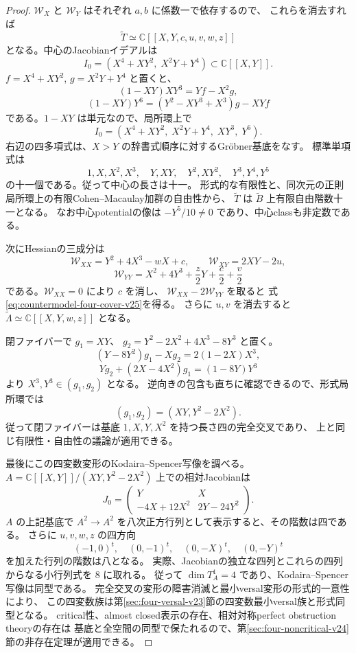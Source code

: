 \begin{proof}
$\mathcal W_X$ と $\mathcal W_Y$ はそれぞれ $a,b$ に係数一で依存するので、
これらを消去すれば
\[
 \widetilde T\simeq\mathbb C[[X,Y,c,u,v,w,z]]
\]
となる。中心のJacobianイデアルは
\[
 I_0=(X^4+XY^2,\;X^2Y+Y^4)\subset\mathbb C[[X,Y]].
\]
$f=X^4+XY^2$, $g=X^2Y+Y^4$ と置くと、
\[
 (1-XY)XY^3=Yf-X^2g,
\]
\[
 (1-XY)Y^6=(Y^2-XY^3+X^3)g-XYf
\]
である。$1-XY$ は単元なので、局所環上で
\[
 I_0=(X^4+XY^2,\;X^2Y+Y^4,\;XY^3,\;Y^6).
\]
右辺の四多項式は、$X>Y$ の辞書式順序に対するGr\"obner基底をなす。
標準単項式は
\[
 1,X,X^2,X^3,\quad Y,XY,\quad Y^2,XY^2,\quad Y^3,Y^4,Y^5
\]
の十一個である。従って中心の長さは十一。
形式的な有限性と、同次元の正則局所環上の有限Cohen--Macaulay加群の自由性から、
$\widetilde T$ は $\widetilde B$ 上有限自由階数十一となる。
なお中心potentialの像は $-Y^5/10\ne0$ であり、中心classも非定数である。

次にHessianの三成分は
\[
 \mathcal W_{XX}=Y^2+4X^3-wX+c,
 \qquad \mathcal W_{XY}=2XY-2u,
\]
\[
 \mathcal W_{YY}=X^2+4Y^3+\frac z2Y+\frac c2+\frac v2
\]
である。$\mathcal W_{XX}=0$ により $c$ を消し、
$\mathcal W_{XX}-2\mathcal W_{YY}$ を取ると
式\eqref{eq:countermodel-four-cover-v25}を得る。
さらに $u,v$ を消去すると
$\widetilde\Lambda\simeq\mathbb C[[X,Y,w,z]]$ となる。

閉ファイバーで $g_1=XY$、
$g_2=Y^2-2X^2+4X^3-8Y^3$ と置く。
\[
 (Y-8Y^2)g_1-Xg_2=2(1-2X)X^3,
\]
\[
 Yg_2+(2X-4X^2)g_1=(1-8Y)Y^3
\]
より $X^3,Y^3\in(g_1,g_2)$ となる。
逆向きの包含も直ちに確認できるので、形式局所環では
\[
 (g_1,g_2)=(XY,Y^2-2X^2).
\]
従って閉ファイバーは基底 $1,X,Y,X^2$ を持つ長さ四の完全交叉であり、
上と同じ有限性・自由性の議論が適用できる。

最後にこの四変数変形のKodaira--Spencer写像を調べる。
$A=\mathbb C[[X,Y]]/(XY,Y^2-2X^2)$ 上での相対Jacobianは
\[
 J_0=
 \begin{pmatrix}
 Y&X\\
 -4X+12X^2&2Y-24Y^2
 \end{pmatrix}.
\]
$A$ の上記基底で $A^2\to A^2$ を八次正方行列として表示すると、その階数は四である。
さらに $u,v,w,z$ の四方向
\[
 (-1,0)^t,\quad (0,-1)^t,\quad (0,-X)^t,\quad(0,-Y)^t
\]
を加えた行列の階数は八となる。
実際、Jacobianの独立な四列とこれらの四列からなる小行列式を $8$ に取れる。
従って $\dim T^1_A=4$ であり、Kodaira--Spencer写像は同型である。
完全交叉の変形の障害消滅と最小versal変形の形式的一意性により、
この四変数族は第\ref{sec:four-versal-v23}節の四変数最小versal族と形式同型となる。
critical性、almost closed表示の存在、相対対称perfect obstruction theoryの存在は
基底と全空間の同型で保たれるので、第\ref{sec:four-noncritical-v24}節の非存在定理が適用できる。
\end{proof}

